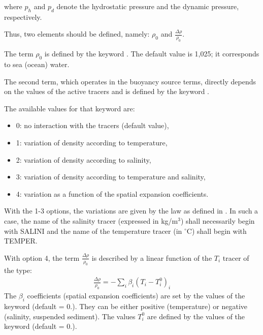 where $p_{h} $ and $p_{d} $ denote the hydrostatic pressure and the dynamic
pressure, respectively.

Thus, two elements should be defined, namely: $\rho_{0} $ and $\frac{\Delta
\rho }{\rho _{0} } $.

The term $\rho _{0} $ is defined by the keyword .
The default value is 1,025; it corresponds to sea (ocean) water.

The second term, which operates in the buoyancy source terms, directly depends
on the values of the active tracers and is defined by the keyword
.

The available values for that keyword  are:

\begin{itemize}
\item  0: no interaction with the tracers (default value),

\item  1: variation of density according to temperature,

\item  2: variation of density according to salinity,

\item  3: variation of density according to temperature and salinity,

\item  4: variation as a function of the spatial expansion coefficients.
\end{itemize}

With the 1-3 options, the variations are given by the law as defined in
. In such a case, the name of the salinity tracer (expressed in
kg/m${}^{3}$) shall necessarily begin with SALINI and the name of the
temperature tracer (in ${}^\circ$C) shall begin with TEMPER.

With option 4, the term $\frac{\Delta \rho }{\rho _{0} } $ is described by a
linear function of the $T_i$ tracer of the type:
\begin{align}
\frac{\Delta \rho }{\rho _{0} } =-\sum _{i}\beta _{i}  (T_{i} -T_{i}^{0} )_{i}
\end{align}
The $\beta_{i}$ coefficients (spatial expansion coefficients) are set by the
values of the keyword  (default
= 0.). They can be either positive (temperature) or negative (salinity,
suspended sediment). The values $T_{i}^{0}$ are defined by the values of the
keyword  (default = 0.).

